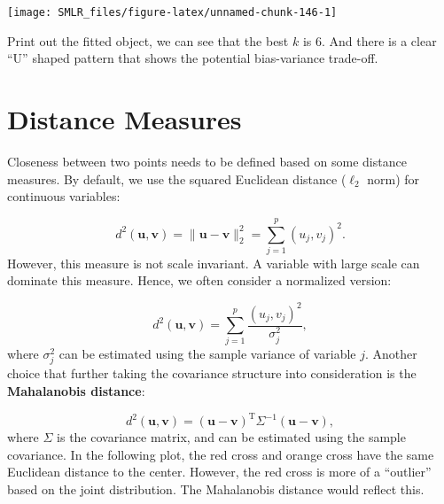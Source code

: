 \documentclass[
]{book}
\theoremstyle{definition}
\theoremstyle{definition}
\theoremstyle{definition}
\theoremstyle{definition}
\theoremstyle{remark}
\begin{document}
\begin{center}\texttt{[image: SMLR\_files/figure-latex/unnamed-chunk-146-1]} \end{center}

Print out the fitted object, we can see that the best \(k\) is 6. And there is a clear ``U'' shaped pattern that shows the potential bias-variance trade-off.

\hypertarget{distance-measures}{%
\section{Distance Measures}\label{distance-measures}}

Closeness between two points needs to be defined based on some distance measures. By default, we use the squared Euclidean distance (\(\ell_2\) norm) for continuous variables:

\[d^2(\mathbf{u}, \mathbf{v}) = \lVert \mathbf{u}- \mathbf{v}\rVert_2^2 = \sum_{j=1}^p (u_j, v_j)^2.\]
However, this measure is not scale invariant. A variable with large scale can dominate this measure. Hence, we often consider a normalized version:

\[d^2(\mathbf{u}, \mathbf{v}) = \sum_{j=1}^p \frac{(u_j, v_j)^2}{\sigma_j^2},\]
where \(\sigma_j^2\) can be estimated using the sample variance of variable \(j\). Another choice that further taking the covariance structure into consideration is the \textbf{Mahalanobis distance}:

\[d^2(\mathbf{u}, \mathbf{v}) = (\mathbf{u}- \mathbf{v})^\text{T}\Sigma^{-1} (\mathbf{u}- \mathbf{v}),\]
where \(\Sigma\) is the covariance matrix, and can be estimated using the sample covariance. In the following plot, the red cross and orange cross have the same Euclidean distance to the center. However, the red cross is more of a ``outlier'' based on the joint distribution. The Mahalanobis distance would reflect this.
\end{document}
